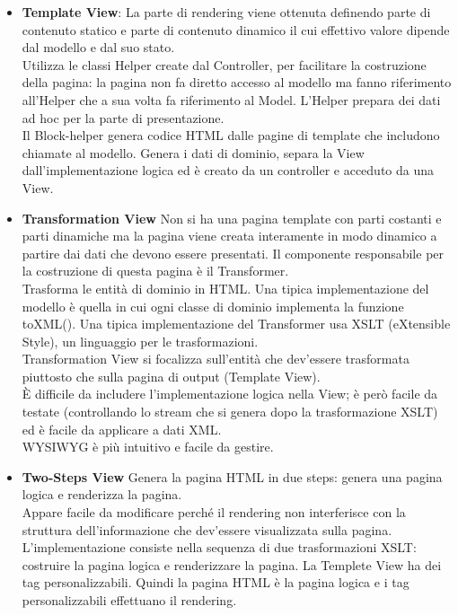 \begin{itemize}
    \begin{itemize}
        \item \textbf{ Template View}: La parte di rendering viene ottenuta definendo parte di contenuto statico e parte di contenuto dinamico il cui effettivo valore dipende dal modello e dal suo stato. \\
        Utilizza le classi Helper create dal Controller, per facilitare la costruzione della pagina: la pagina non fa diretto accesso al modello ma fanno riferimento all’Helper che a sua volta fa riferimento al Model. L’Helper prepara dei dati ad hoc per la parte di presentazione.\\
        Il Block-helper genera codice HTML dalle pagine di template che includono chiamate al modello. Genera i dati di dominio, separa la View dall’implementazione logica ed è creato da un controller e acceduto da una View.
        \item \textbf{Transformation View}  Non si ha una pagina template con parti costanti e parti dinamiche ma la pagina viene creata interamente in modo dinamico a partire dai dati che devono essere presentati. Il componente responsabile per la costruzione di questa pagina è il Transformer.\\
        Trasforma le entità di dominio in HTML. Una tipica implementazione del modello è quella in cui ogni classe di dominio implementa la funzione toXML(). Una tipica implementazione del Transformer usa XSLT (eXtensible Style), un linguaggio per le trasformazioni.\\
        Transformation View si focalizza sull’entità che dev’essere trasformata piuttosto che sulla pagina di output (Template View).\\
        È difficile da includere l’implementazione logica nella View; è però facile da testate (controllando lo stream che si genera dopo la trasformazione XSLT) ed è facile da applicare a dati XML.\\
        WYSIWYG è più intuitivo e facile da gestire.
        \item \textbf{Two-Steps View} Genera la pagina HTML in due steps: genera una pagina logica e renderizza la pagina.\\
        Appare facile da modificare perché il rendering non interferisce con la struttura dell’informazione che dev’essere visualizzata sulla pagina.
        L’implementazione consiste nella sequenza di due trasformazioni XSLT: costruire la pagina logica e renderizzare la pagina.
        La Templete View ha dei tag personalizzabili.
        Quindi la pagina HTML è la pagina logica e i tag personalizzabili effettuano il rendering.
    \end{itemize}
\end{itemize}
